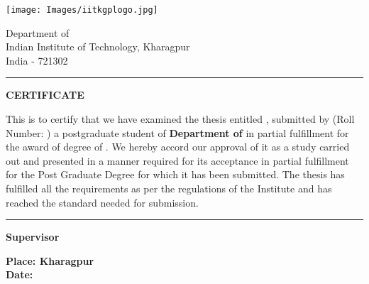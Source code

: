 \thispagestyle{plain}

\begin{multicols}{2}
 \flushleft
 \texttt{[image: Images/iitkgplogo.jpg]}
 \columnbreak
 \par
 Department of \mydep \\
 Indian Institute of Technology, Kharagpur \\
 India - 721302
\end{multicols}

\vspace{0.5\baselineskip}
\hrule
\vspace{3\baselineskip}

\begin{center}
{\Large {\bf \uppercase{Certificate}}}
\end{center}

\vspace{\baselineskip}

\noindent This is to certify that we have examined the thesis entitled {\bf \mytitle}, submitted by {\bf \myname}(Roll Number: {\textit{\myrollno}}) a postgraduate student of {\bf Department of \mydep}  in partial fulfillment for the award of degree of \mydegree. We hereby accord our approval of it as a study carried out and presented in a manner required for its acceptance in partial fulfillment for the Post Graduate Degree for which it has been submitted. The thesis has fulfilled all the requirements as per the regulations of the Institute and has reached the standard needed for submission.
\vspace{3\baselineskip}
\begin{flushright}
\begin{minipage}[c]{0.45\textwidth}
\centering
\hrule 
\vspace{0.5\baselineskip}
{\Large \bf Supervisor} \\
\end{minipage}
\end{flushright}
\vspace{\baselineskip}

\noindent
{\large \bf Place: Kharagpur} \\
{\large \bf Date: }
